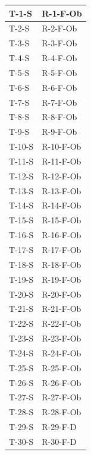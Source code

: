 \documentclass[a4paper,12pt]{article}
\begin{document}
{{\begin{longtable}{|
                    >{\centering\arraybackslash}p{}|
                    >{\centering\arraybackslash}p{}|
                }
                \hline
                \endlastfoot
                \hline 
                T-1-S & R-1-F-Ob \\ \hline
                T-2-S & R-2-F-Ob \\ \hline
                T-3-S & R-3-F-Ob \\ \hline
                T-4-S & R-4-F-Ob \\ \hline
                T-5-S & R-5-F-Ob \\ \hline
                T-6-S & R-6-F-Ob \\ \hline
                T-7-S & R-7-F-Ob \\ \hline
                T-8-S & R-8-F-Ob \\ \hline
                T-9-S & R-9-F-Ob \\ \hline
                T-10-S & R-10-F-Ob \\ \hline
                T-11-S & R-11-F-Ob \\ \hline
                T-12-S & R-12-F-Ob \\ \hline
                T-13-S & R-13-F-Ob \\ \hline
                T-14-S & R-14-F-Ob \\ \hline
                T-15-S & R-15-F-Ob \\ \hline
                T-16-S & R-16-F-Ob \\ \hline
                T-17-S & R-17-F-Ob \\ \hline
                T-18-S & R-18-F-Ob \\ \hline
                T-19-S & R-19-F-Ob \\ \hline
                T-20-S & R-20-F-Ob \\ \hline
                T-21-S & R-21-F-Ob \\ \hline
                T-22-S & R-22-F-Ob \\ \hline
                T-23-S & R-23-F-Ob \\ \hline
                T-24-S & R-24-F-Ob \\ \hline
                T-25-S & R-25-F-Ob \\ \hline
                T-26-S & R-26-F-Ob \\ \hline
                T-27-S & R-27-F-Ob \\ \hline
                T-28-S & R-28-F-Ob \\ \hline
                T-29-S & R-29-F-D \\ \hline
                T-30-S & R-30-F-D \\ \hline

\end{longtable}}}
\end{document}
